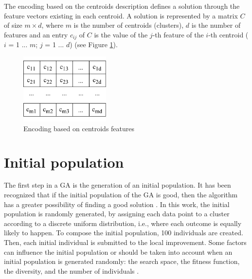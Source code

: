 The encoding based on the centroids description defines a solution through the feature vectors existing in each centroid. A solution is represented by a matrix $C$ of size $m \times d$, where $m$ is the number of centroids (clusters), $d$ is the number of features and an entry $c_{ij}$ of $C$ is the value of the $j$-th feature of the $i$-th centroid ($i$ = 1 ... $m$; $j$ = 1 ... $d$) (see Figure \ref{fig:centroids-encoding}).

\begin{figure}[h]
  \begin{center}
    \includegraphics[width=0.4\textwidth]{img/centroids-encoding}
    \caption{Encoding based on centroids features}\label{fig:centroids-encoding}
  \end{center}
\end{figure}

\section{Initial population}
\label{sec:initial-population}
The first step in a GA is the generation of an initial population. It has been recognized that if the initial population of the GA is good, then the algorithm has a greater possibility of finding a good solution \cite{Burke2004, Zitzler2000}. In this work, the initial population is randomly generated, by assigning each data point to a cluster according to a discrete uniform distribution, i.e., where each outcome is equally likely to happen. To compose the initial population, 100 individuals are created. Then, each initial individual is submitted to the local improvement. Some factors can influence the initial population or should be taken into account when an initial population is generated randomly: the search space, the fitness function, the diversity, and the number of individuals \cite{DiazGomez2007}.

